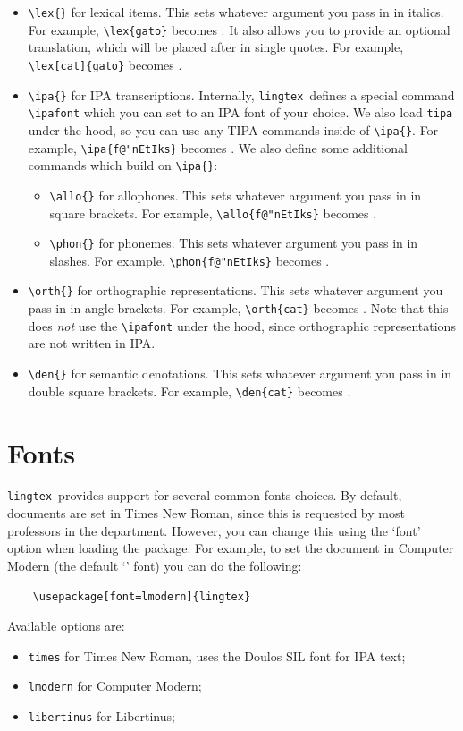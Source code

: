 \documentclass{article}
\def\lingtex{\texttt{lingtex}}
\begin{document}
\begin{itemize}
	\item \verb|\lex{}| for lexical items. This sets whatever argument you pass in in italics. For example, \verb|\lex{gato}| becomes . It also allows you to provide an optional translation, which will be placed after in single quotes. For example, \verb|| becomes \lex[cat]{gato}.
	\item \verb|\ipa{}| for IPA transcriptions. Internally, \lingtex\ defines a special command \verb|\ipafont| which you can set to an IPA font of your choice. We also load \verb|tipa| under the hood, so you can use any TIPA commands inside of \verb|\ipa{}|. For example, \verb|\ipa{f@"nEtIks}| becomes . We also define some additional commands which build on \verb|\ipa{}|:
	      \begin{itemize}
		      \item \verb|\allo{}| for allophones. This sets whatever argument you pass in in square brackets. For example, \verb|| becomes \allo{f@"nEtIks}.
		      \item \verb|\phon{}| for phonemes. This sets whatever argument you pass in in slashes. For example, \verb|| becomes \phon{f@"nEtIks}.
	      \end{itemize}
	\item \verb|\orth{}| for orthographic representations. This sets whatever argument you pass in in angle brackets. For example, \verb|\orth{cat}| becomes . Note that this does \emph{not} use the \verb|\ipafont| under the hood, since orthographic representations are not written in IPA.
	\item \verb|\den{}| for semantic denotations. This sets whatever argument you pass in in double square brackets. For example, \verb|| becomes \den{cat}.
\end{itemize}

\section{Fonts} \label{sec:fonts}

\lingtex\ provides support for several common fonts choices. By default, documents are set in Times New Roman, since this is requested by most professors in the department. However, you can change this using the `font' option when loading the package. For example, to set the document in Computer Modern (the default `' font) you can do the following:
\begin{verbatim}
    \usepackage[font=lmodern]{lingtex}
\end{verbatim}
Available options are:
\begin{itemize}
	\item \verb|times| for Times New Roman, uses the Doulos SIL font for IPA text;
	\item \verb|lmodern| for Computer Modern;
	\item \verb|libertinus| for Libertinus;
\end{itemize}
\end{document}
